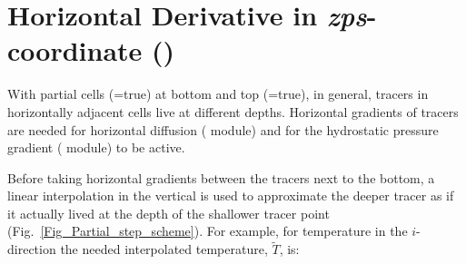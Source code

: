\documentclass[NEMO_book]{subfiles}
\begin{document}
\section  [Horizontal Derivative in \textit{zps}-coordinate (\textit{zpshde})]
		{Horizontal Derivative in \textit{zps}-coordinate ()}
\label{TRA_zpshde}


With partial cells (=true) at bottom and top (=true), in general, tracers in horizontally 
adjacent cells live at different depths. Horizontal gradients of tracers are needed 
for horizontal diffusion ( module) and for the hydrostatic pressure 
gradient ( module) to be active. 

Before taking horizontal gradients between the tracers next to the bottom, a linear 
interpolation in the vertical is used to approximate the deeper tracer as if it actually 
lived at the depth of the shallower tracer point (Fig.~\ref{Fig_Partial_step_scheme}). 
For example, for temperature in the $i$-direction the needed interpolated 
temperature, $\widetilde{T}$, is:
\end{document}
